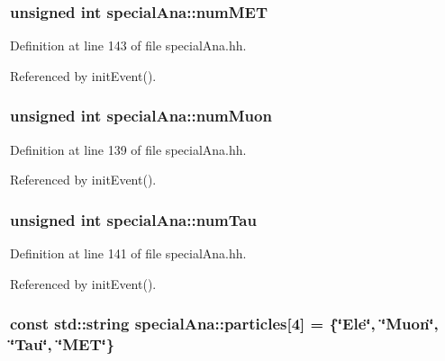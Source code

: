 \subsubsection[{num\-M\-E\-T}]{\setlength{\rightskip}{0pt plus 5cm}unsigned int special\-Ana\-::num\-M\-E\-T}\label{classspecialAna_a13da6896f59e970912c902579e3887e5}


Definition at line 143 of file special\-Ana.\-hh.



Referenced by init\-Event().

\subsubsection[{num\-Muon}]{\setlength{\rightskip}{0pt plus 5cm}unsigned int special\-Ana\-::num\-Muon}\label{classspecialAna_af9324bf8986d292f34deeb070d0eccb1}


Definition at line 139 of file special\-Ana.\-hh.



Referenced by init\-Event().

\subsubsection[{num\-Tau}]{\setlength{\rightskip}{0pt plus 5cm}unsigned int special\-Ana\-::num\-Tau}\label{classspecialAna_a3f9a479af1480789df7ac7978b61cca5}


Definition at line 141 of file special\-Ana.\-hh.



Referenced by init\-Event().

\subsubsection[{particles}]{\setlength{\rightskip}{0pt plus 5cm}const std\-::string special\-Ana\-::particles\mbox{[}4\mbox{]} = \{\char`\"{}Ele\char`\"{}, \char`\"{}Muon\char`\"{}, \char`\"{}Tau\char`\"{}, \char`\"{}M\-E\-T\char`\"{}\}}\label{classspecialAna_a68eaaa795a5c08f7505d44b51361b224}


